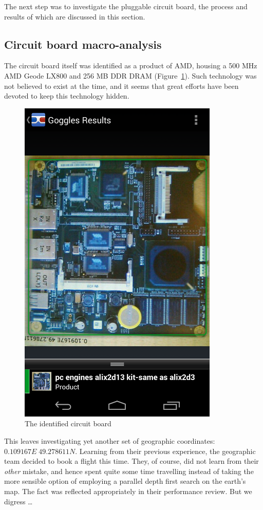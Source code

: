 The next step was to investigate the pluggable circuit board, the process and results of which are discussed in this section.

\subsection{Circuit board macro-analysis}
The circuit board itself was identified as a product of AMD, housing a 500 MHz AMD Geode LX800 and 256 MB DDR DRAM (Figure~\ref{fig:circuit-board}). Such technology was not believed to exist at the time, and it seems that great efforts have been devoted to keep this technology hidden.


\begin{figure}[h]
    \centering
    \includegraphics[width=0.8\columnwidth]{img/circuit-board.png}
    \caption{The identified circuit board}
    \label{fig:circuit-board}
\end{figure}

This leaves investigating yet another set of geographic coordinates: $0.109167E \; 49.278611N$. Learning from their previous experience, the geographic team decided to book a flight this time. They, of course, did not learn from their \emph{other} mistake, and hence spent quite some time travelling instead of taking the more sensible option of employing a parallel depth first search on the earth's map. The fact was reflected appropriately in their performance review. But we digress \ldots


